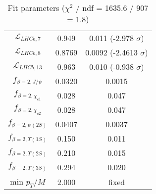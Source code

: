 \begin{table}[h!]
\begin{tabular}{c|c|c}
$\mathcal L_{LHCb,7}$ & 0.949 & 0.011 (-2.978 $\sigma$) \\
$\mathcal L_{LHCb,8}$ & 0.8769 & 0.0092 (-2.4613 $\sigma$) \\
$\mathcal L_{LHCb,13}$ & 0.963 & 0.010 (-0.938 $\sigma$) \\
$f_{\beta=2,J/\psi}$ & 0.0320 & 0.0015 \\
$f_{\beta=2,\chi_{c1}}$ & 0.028 & 0.047 \\
$f_{\beta=2,\chi_{c2}}$ & 0.028 & 0.047 \\
$f_{\beta=2,\psi(2S)}$ & 0.0407 & 0.0037 \\
$f_{\beta=2,\Upsilon(1S)}$ & 0.150 & 0.011 \\
$f_{\beta=2,\Upsilon(2S)}$ & 0.210 & 0.015 \\
$f_{\beta=2,\Upsilon(3S)}$ & 0.294 & 0.020 \\
min $p_T/M$ & 2.000 & fixed \\
\end{tabular}
\caption{Fit parameters ($\chi^2$ / ndf = 1635.6 / 907 = 1.8)}
\end{table}
